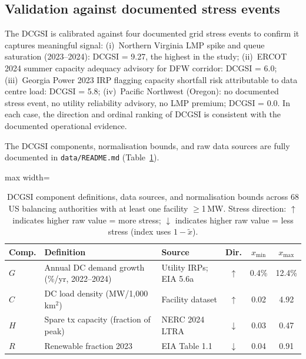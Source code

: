 \documentclass[preprint,12pt]{elsarticle}
\begin{document}
\subsection{Validation against documented stress events}
\label{subsec:dcgsi_validation}

The DCGSI is calibrated against four documented grid stress events to
confirm it captures meaningful signal:
(i)~Northern Virginia LMP spike and queue saturation (2023--2024):
DCGSI = 9.27, the highest in the study;
(ii)~ERCOT 2024 summer capacity adequacy advisory for DFW corridor:
DCGSI = 6.0;
(iii)~Georgia Power 2023 IRP flagging capacity shortfall risk attributable
to data centre load: DCGSI = 5.8;
(iv)~Pacific Northwest (Oregon): no documented stress event, no utility
reliability advisory, no LMP premium; DCGSI = 0.0.
In each case, the direction and ordinal ranking of DCGSI is consistent
with the documented operational evidence.

The DCGSI components, normalisation bounds, and raw data sources are
fully documented in \texttt{data/README.md} (Table~\ref{tab:dcgsi_sources}).

\begin{table}[htbp]
\centering
\caption{DCGSI component definitions, data sources, and normalisation
bounds across 68 US balancing authorities with at least one facility
$\geq$1\,MW. Stress direction: $\uparrow$ indicates higher raw value
= more stress; $\downarrow$ indicates higher raw value = less stress
(index uses $1 - \tilde{x}$).}
\label{tab:dcgsi_sources}
\small
\begin{adjustbox}{max width=\linewidth}
\begin{tabular}{@{}p{1.8cm}p{4.8cm}p{3.2cm}ccc@{}}
\toprule
\textbf{Comp.} & \textbf{Definition} & \textbf{Source} &
\textbf{Dir.} & $x_{\min}$ & $x_{\max}$ \\
\midrule
$G$ & Annual DC demand growth (\%/yr, 2022--2024) &
Utility IRPs; EIA 5.6a & $\uparrow$ & 0.4\% & 12.4\% \\
$C$ & DC load density (MW/1{,}000\,km$^2$) &
Facility dataset & $\uparrow$ & 0.02 & 4.92 \\
$H$ & Spare tx capacity (fraction of peak) &
NERC 2024 LTRA & $\downarrow$ & 0.03 & 0.47 \\
$R$ & Renewable fraction 2023 &
EIA Table 1.1 & $\downarrow$ & 0.04 & 0.91 \\
\bottomrule
\end{tabular}
\end{adjustbox}
\end{table}
\end{document}
